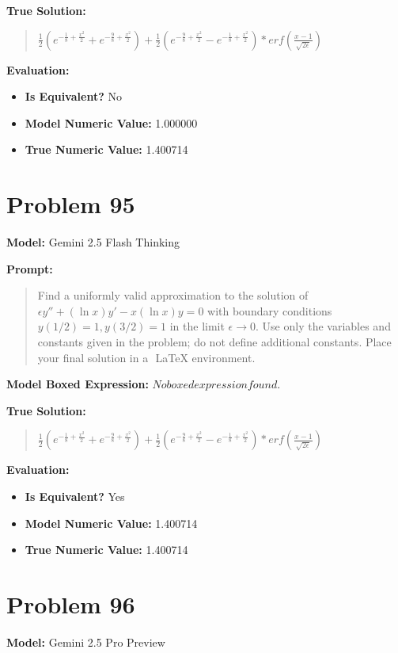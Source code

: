 \documentclass{article}
\begin{document}
{\textbf{True Solution:}
\begin{quote}
$\frac{1}{2} \left( e^{-\frac{1}{8} + \frac{x^2}{2}} + e^{-\frac{9}{8} + \frac{x^2}{2}} \right) + \frac{1}{2} \left( e^{-\frac{9}{8} + \frac{x^2}{2}} - e^{-\frac{1}{8} + \frac{x^2}{2}}\right) * erf\left(\frac{x-1}{\sqrt{2\epsilon}}\right)$
\end{quote}

\textbf{Evaluation:}
\begin{itemize}
\item \textbf{Is Equivalent?} No
\item \textbf{Model Numeric Value:} 1.000000
\item \textbf{True Numeric Value:} 1.400714
\end{itemize}
\vspace{1cm}
\section*{Problem 95}
\textbf{Model:} Gemini 2.5 Flash Thinking

\textbf{Prompt:}
\begin{quote}
Find a uniformly valid approximation to the solution of $\epsilon y'' + (\ln x)y' - x(\ln x)y = 0$ with boundary conditions $y(1/2) = 1, y(3/2) = 1$ in the limit $\epsilon \to 0$. Use only the variables and constants given in the problem; do not define additional constants. Place your final solution in a $\boxed{}$ LaTeX environment.
\end{quote}
\textbf{Model Boxed Expression:} $No boxed expression found.$

\textbf{True Solution:}
\begin{quote}
$\frac{1}{2} \left( e^{-\frac{1}{8} + \frac{x^2}{2}} + e^{-\frac{9}{8} + \frac{x^2}{2}} \right) + \frac{1}{2} \left( e^{-\frac{9}{8} + \frac{x^2}{2}} - e^{-\frac{1}{8} + \frac{x^2}{2}}\right) * erf\left(\frac{x-1}{\sqrt{2\epsilon}}\right)$
\end{quote}

\textbf{Evaluation:}
\begin{itemize}
\item \textbf{Is Equivalent?} Yes
\item \textbf{Model Numeric Value:} 1.400714
\item \textbf{True Numeric Value:} 1.400714
\end{itemize}
\vspace{1cm}
\section*{Problem 96}
\textbf{Model:} Gemini 2.5 Pro Preview

}
\end{document}
